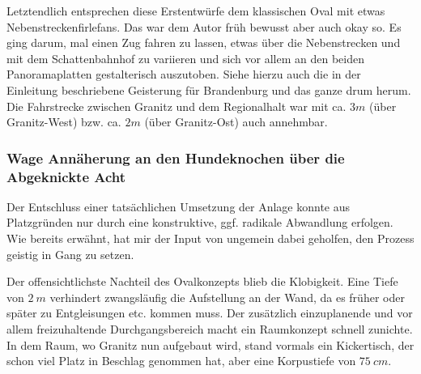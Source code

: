 Letztendlich entsprechen diese Erstentw\"urfe dem klassischen Oval mit etwas Nebenstreckenfirlefans.
Das war dem Autor fr\"uh bewusst aber auch okay so.
Es ging darum, mal einen Zug fahren zu lassen, etwas \"uber die Nebenstrecken und mit dem Schattenbahnhof zu variieren und sich vor allem an den beiden Panoramaplatten gestalterisch auszutoben.
Siehe hierzu auch die in der Einleitung beschriebene Geisterung f\"ur Brandenburg und das ganze drum herum.
Die Fahrstrecke zwischen Granitz und dem Regionalhalt war mit ca. $3m$ (\"uber Granitz-West) bzw. ca. $2m$ (\"uber Granitz-Ost) auch annehmbar.


\subsubsection{Wage Ann\"aherung an den Hundeknochen \"uber die Abgeknickte Acht}
\label{sec:map_development_state2}

Der Entschluss einer tats\"achlichen Umsetzung der Anlage konnte aus Platzgr\"unden nur durch eine konstruktive, ggf. radikale Abwandlung erfolgen.
Wie bereits erw\"ahnt, hat mir der Input von \cite{Gee17} ungemein dabei geholfen, den Prozess geistig in Gang zu setzen.

Der offensichtlichste Nachteil des Ovalkonzepts blieb die Klobigkeit.
Eine Tiefe von $2~m$ verhindert zwangsl\"aufig die Aufstellung an der Wand, da es fr\"uher oder sp\"ater zu Entgleisungen etc. kommen muss.
Der zus\"atzlich einzuplanende und vor allem freizuhaltende Durchgangsbereich macht ein Raumkonzept schnell zunichte.
In dem Raum, wo Granitz nun aufgebaut wird, stand vormals ein Kickertisch, der schon viel Platz in Beschlag genommen hat, aber eine Korpustiefe von $75~cm$.

